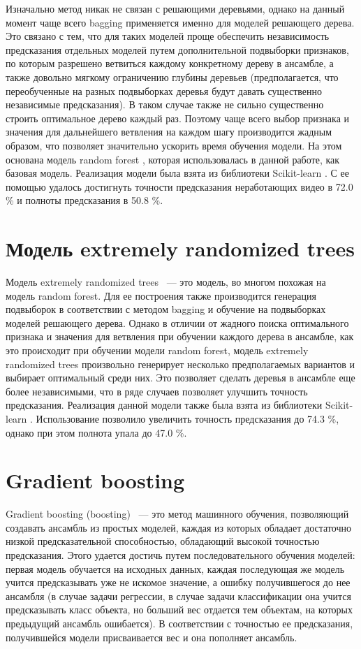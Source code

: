 Изначально метод никак не связан с решающими деревьями, однако на данный момент чаще всего bagging применяется именно для моделей решающего дерева. Это связано с тем, что для таких моделей проще обеспечить независимость предсказания отдельных моделей путем дополнительной подвыборки признаков, по которым разрешено ветвиться каждому конкретному дереву в ансамбле, а также довольно мягкому ограничению глубины деревьев (предполагается, что переобученные на разных подвыборках деревья будут давать существенно независимые предсказания). В таком случае также не сильно существенно строить оптимальное дерево каждый раз. Поэтому чаще всего выбор признака и значения для дальнейшего ветвления на каждом шагу производится жадным образом, что позволяет значительно ускорить время обучения модели. На этом основана модель random forest \cite{Ho}, которая использовалась в данной работе, как базовая модель. Реализация модели была взята из библиотеки Scikit-learn \cite{scikit-learn}. С ее помощью удалось достигнуть точности предсказания неработающих видео в 72.0 \% и полноты предсказания в 50.8 \%.

\section{Модель extremely randomized trees}

Модель extremely randomized trees \cite{Geurts2006}~--- это модель, во многом похожая на модель random forest. Для ее построения также производится генерация подвыборок в соответствии с методом bagging и обучение на подвыборках моделей решающего дерева. Однако в отличии от жадного поиска оптимального признака и значения для ветвления при обучении каждого дерева в ансамбле, как это происходит при обучении модели random forest, модель extremely randomized trees произвольно генерирует несколько предполагаемых вариантов и выбирает оптимальный среди них. Это позволяет сделать деревья в ансамбле еще более независимыми, что в ряде случаев позволяет улучшить точность предсказания. Реализация данной модели также была взята из библиотеки Scikit-learn \cite{scikit-learn}. Использование позволило увеличить точность предсказания до 74.3 \%, однако при этом полнота упала до 47.0 \%.

\section{Gradient boosting}

Gradient boosting (boosting) \cite{Friedman2001}~--- это метод машинного обучения, позволяющий создавать ансамбль из простых моделей, каждая из которых обладает достаточно низкой предсказательной способностью, обладающий высокой точностью предсказания. Этого удается достичь путем последовательного обучения моделей: первая модель обучается на исходных данных, каждая последующая же модель учится предсказывать уже не искомое значение, а ошибку получившегося до нее ансамбля (в случае задачи регрессии, в случае задачи классификации она учится предсказывать класс объекта, но больший вес отдается тем объектам, на которых предыдущий ансамбль ошибается). В соответствии с точностью ее предсказания, получившейся модели присваивается вес и она пополняет ансамбль.


